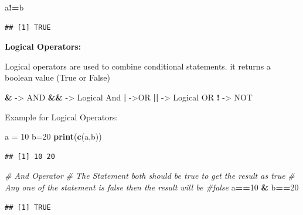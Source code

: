 \documentclass[
]{article}
\newenvironment{Shaded}{\begin{snugshade}}{\end{snugshade}}
\newcommand{\CommentTok}[1]{\textcolor[rgb]{0.56,0.35,0.01}{\textit{#1}}}
\newcommand{\DecValTok}[1]{\textcolor[rgb]{0.00,0.00,0.81}{#1}}
\newcommand{\FunctionTok}[1]{\textcolor[rgb]{0.13,0.29,0.53}{\textbf{#1}}}
\newcommand{\NormalTok}[1]{#1}
\newcommand{\OtherTok}[1]{\textcolor[rgb]{0.56,0.35,0.01}{#1}}
\newcommand{\SpecialCharTok}[1]{\textcolor[rgb]{0.81,0.36,0.00}{\textbf{#1}}}
\begin{document}
\begin{Shaded}
\begin{Highlighting}[]
\NormalTok{a}\SpecialCharTok{!=}\NormalTok{b}
\end{Highlighting}
\end{Shaded}

\begin{verbatim}
## [1] TRUE
\end{verbatim}

\newpage

\textbf{Logical Operators:}

Logical operators are used to combine conditional statements. it returns
a boolean value (True or False)

\begin{Shaded}
\begin{Highlighting}[]
\SpecialCharTok{\&} \OtherTok{{-}\textgreater{}}\NormalTok{ AND}
\SpecialCharTok{\&\&} \OtherTok{{-}\textgreater{}}\NormalTok{ Logical And}
\SpecialCharTok{|} \OtherTok{{-}\textgreater{}}\NormalTok{OR}
\SpecialCharTok{||} \OtherTok{{-}\textgreater{}}\NormalTok{ Logical OR}
\SpecialCharTok{!} \OtherTok{{-}\textgreater{}}\NormalTok{ NOT}
\end{Highlighting}
\end{Shaded}

Example for Logical Operators:

\begin{Shaded}
\begin{Highlighting}[]
\NormalTok{a }\OtherTok{=} \DecValTok{10}
\NormalTok{b}\OtherTok{=}\DecValTok{20}
\FunctionTok{print}\NormalTok{(}\FunctionTok{c}\NormalTok{(a,b))}
\end{Highlighting}
\end{Shaded}

\begin{verbatim}
## [1] 10 20
\end{verbatim}

\begin{Shaded}
\begin{Highlighting}[]
\CommentTok{\# And Operator}
\CommentTok{\# The Statement both should be true to get the result as true}
\CommentTok{\# Any one of the statement is false then the result will be \#false}
\NormalTok{a}\SpecialCharTok{==}\DecValTok{10} \SpecialCharTok{\&}\NormalTok{ b}\SpecialCharTok{==}\DecValTok{20}
\end{Highlighting}
\end{Shaded}

\begin{verbatim}
## [1] TRUE
\end{verbatim}
\end{document}
